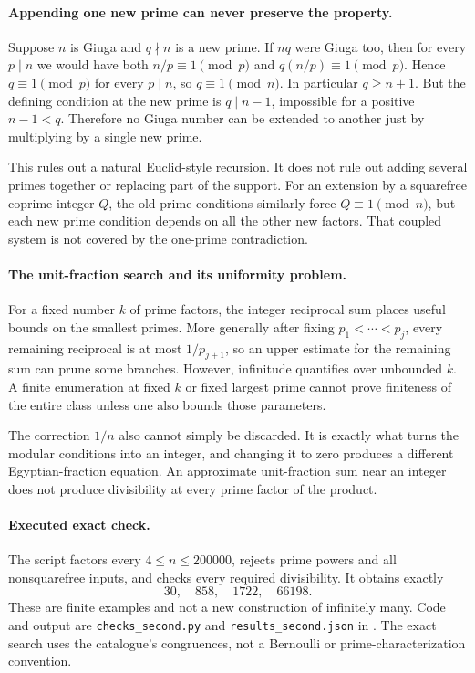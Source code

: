\documentclass[11pt,a4paper]{article}
\begin{document}
\paragraph{Appending one new prime can never preserve the property.}
Suppose $n$ is Giuga and $q\nmid n$ is a new prime. If $nq$ were
Giuga too, then for every $p\mid n$ we would have both
$n/p\equiv1\pmod p$ and $q(n/p)\equiv1\pmod p$. Hence
$q\equiv1\pmod p$ for every $p\mid n$, so $q\equiv1\pmod n$.
In particular $q\ge n+1$. But the defining condition at the new
prime is $q\mid n-1$, impossible for a positive $n-1<q$.
Therefore no Giuga number can be extended to another just by
multiplying by a single new prime.

This rules out a natural Euclid-style recursion. It does not rule out
adding several primes together or replacing part of the support.
For an extension by a squarefree coprime integer $Q$, the old-prime
conditions similarly force $Q\equiv1\pmod n$, but each new prime
condition depends on all the other new factors. That coupled system
is not covered by the one-prime contradiction.

\paragraph{The unit-fraction search and its uniformity problem.}
For a fixed number $k$ of prime factors, the integer reciprocal sum
places useful bounds on the smallest primes. More generally after
fixing $p_1<\cdots<p_j$, every remaining reciprocal is at most
$1/p_{j+1}$, so an upper estimate for the remaining sum can prune
some branches. However, infinitude quantifies over unbounded $k$.
A finite enumeration at fixed $k$ or fixed largest prime cannot prove
finiteness of the entire class unless one also bounds those parameters.

The correction $1/n$ also cannot simply be discarded. It is exactly
what turns the modular conditions into an integer, and changing it to
zero produces a different Egyptian-fraction equation. An approximate
unit-fraction sum near an integer does not produce divisibility at
every prime factor of the product.

\paragraph{Executed exact check.}
The script factors every $4\le n\le200000$, rejects prime powers
and all nonsquarefree inputs, and checks every required divisibility.
It obtains exactly
\[
                         30,\quad858,\quad1722,\quad66198.
\]
These are finite examples and not a new construction of infinitely many.
Code and output are \texttt{checks\_second.py} and
\texttt{results\_second.json} in
.
The exact search uses the catalogue's congruences, not a Bernoulli
or prime-characterization convention.
\end{document}
